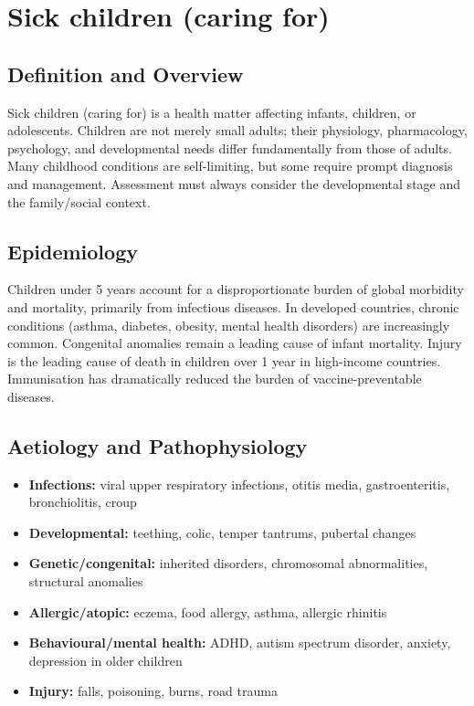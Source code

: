 \chapter{Sick children (caring for)}

\section*{Definition and Overview}
Sick children (caring for) is a health matter affecting infants, children, or adolescents. Children are not merely small adults; their physiology, pharmacology, psychology, and developmental needs differ fundamentally from those of adults. Many childhood conditions are self-limiting, but some require prompt diagnosis and management. Assessment must always consider the developmental stage and the family/social context.

\section*{Epidemiology}
Children under 5 years account for a disproportionate burden of global morbidity and mortality, primarily from infectious diseases. In developed countries, chronic conditions (asthma, diabetes, obesity, mental health disorders) are increasingly common. Congenital anomalies remain a leading cause of infant mortality. Injury is the leading cause of death in children over 1 year in high-income countries. Immunisation has dramatically reduced the burden of vaccine-preventable diseases.

\section*{Aetiology and Pathophysiology}
\begin{itemize}
    \item \textbf{Infections:} viral upper respiratory infections, otitis media, gastroenteritis, bronchiolitis, croup
    \item \textbf{Developmental:} teething, colic, temper tantrums, pubertal changes
    \item \textbf{Genetic/congenital:} inherited disorders, chromosomal abnormalities, structural anomalies
    \item \textbf{Allergic/atopic:} eczema, food allergy, asthma, allergic rhinitis
    \item \textbf{Behavioural/mental health:} ADHD, autism spectrum disorder, anxiety, depression in older children
    \item \textbf{Injury:} falls, poisoning, burns, road trauma
\end{itemize}

